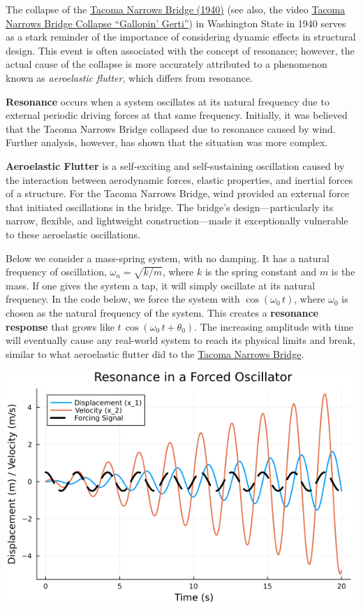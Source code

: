 The collapse of the \href{https://en.wikipedia.org/wiki/Tacoma_Narrows_Bridge_(1940)}{Tacoma Narrows Bridge (1940)} (see also, the video \href{https://www.youtube.com/watch?v=j-zczJXSxnw}{Tacoma Narrows Bridge Collapse ``Gallopin' Gerti''}) in Washington State in 1940 serves as a stark reminder of the importance of considering dynamic effects in structural design. This event is often associated with the concept of resonance; however, the actual cause of the collapse is more accurately attributed to a phenomenon known as \textit{aeroelastic flutter}, which differs from resonance.

\textbf{Resonance} occurs when a system oscillates at its natural frequency due to external periodic driving forces at that same frequency. Initially, it was believed that the Tacoma Narrows Bridge collapsed due to resonance caused by wind. Further analysis, however, has shown that the situation was more complex.

\textbf{Aeroelastic Flutter} is a self-exciting and self-sustaining oscillation caused by the interaction between aerodynamic forces, elastic properties, and inertial forces of a structure. For the Tacoma Narrows Bridge, wind provided an external force that initiated oscillations in the bridge. The bridge's design—particularly its narrow, flexible, and lightweight construction—made it exceptionally vulnerable to these aeroelastic oscillations.


\bigskip

Below we consider a mass-spring system, with no damping. It has a natural frequency of oscillation, $\omega_n = \sqrt{k / m} $, where $k$ is the spring constant and $m$ is the mass. If one gives the system a tap, it will simply oscillate at its natural frequency. In the code below, we force the system with $\cos(\omega_0\, t)$, where $\omega_0$ is chosen as the natural frequency of the system. This creates a \textbf{resonance response} that grows like $t\, \cos(\omega_0\, t + \theta_0)$. The increasing amplitude with time will eventually cause any real-world system to reach its physical limits and break, similar to what aeroelastic flutter did to the \href{https://www.youtube.com/results?search_query=tacoma+narrows+bridge+collapse}{Tacoma Narrows Bridge}.

\bigskip

\begin{center}
    \includegraphics[width=0.6\columnwidth]{graphics/Chap09/ResonanceLinearSystem.png}
\end{center}



